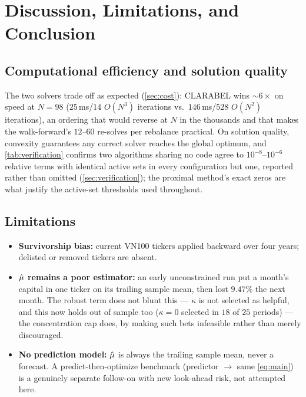 \section{Discussion, Limitations, and Conclusion}\label{sec:conclusion}

\subsection{Computational efficiency and solution quality}

The two solvers trade off as expected (\cref{sec:cost}): CLARABEL wins $\sim6\times$ on speed at
$N=98$ ($25$\,ms/$14$ $O(N^3)$ iterations vs.\ $146$\,ms/$528$ $O(N^2)$ iterations), an ordering
that would reverse at $N$ in the thousands and that makes the walk-forward's $12$--$60$ re-solves
per rebalance practical. On solution quality, convexity guarantees any correct solver reaches the
global optimum, and \cref{tab:verification} confirms two algorithms sharing no code agree to
$10^{-8}$--$10^{-6}$ relative terms with identical active sets in every configuration but one,
reported rather than omitted (\cref{sec:verification}); the proximal method's exact zeros are
what justify the active-set thresholds used throughout.

\subsection{Limitations}

\begin{itemize}
  \item \textbf{Survivorship bias:} current VN100 tickers applied backward over four years;
        delisted or removed tickers are absent.
  \item \textbf{$\hat{\mu}$ remains a poor estimator:} an early unconstrained run put a month's
        capital in one ticker on its trailing sample mean, then lost $9.47\%$ the next month. The
        robust term does not blunt this --- $\kappa$ is not selected as helpful, and this now
        holds out of sample too ($\kappa=0$ selected in $18$ of $25$ periods) --- the
        concentration cap does, by making such bets infeasible rather than merely discouraged.
  \item \textbf{No prediction model:} $\hat{\mu}$ is always the trailing sample mean, never a
        forecast. A predict-then-optimize benchmark (predictor $\to$ same \cref{eq:main}) is a
        genuinely separate follow-on with new look-ahead risk, not attempted here.
\end{itemize}

